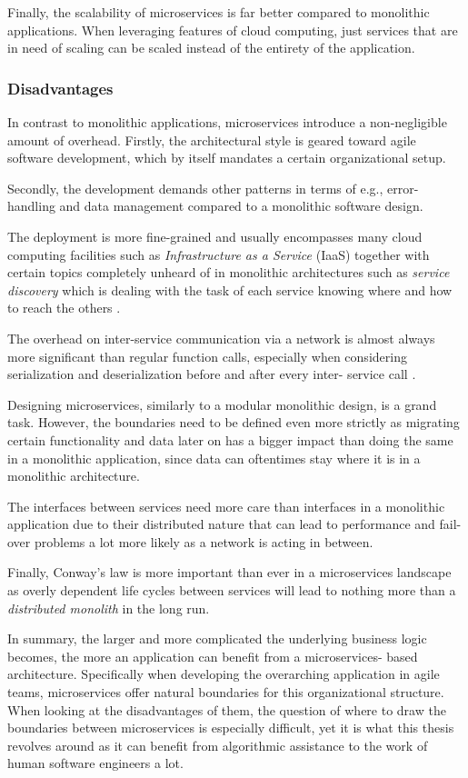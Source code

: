 \documentclass[12pt,a4paper]{report}
\begin{document}
Finally, the scalability of microservices is far better compared to monolithic
applications. When leveraging features of cloud computing, just services that
are in need of scaling can be scaled instead of the entirety of the
application.


\subsubsection{Disadvantages}
In contrast to monolithic applications,
microservices introduce a non\hyp negligible amount of overhead. Firstly, the
architectural style is geared toward agile software development, which by itself
mandates a certain organizational setup.

Secondly, the development demands other patterns in terms of e.g., error\hyp
handling and data management compared to a monolithic software design.

The deployment is more fine-grained and usually encompasses many
cloud computing facilities such as \textit{Infrastructure as a Service} (IaaS)
together with certain topics completely unheard of in monolithic architectures
such as \textit{service discovery} which is dealing with the task of each
service knowing where and how to reach the others \cite{newman2015building}.

The overhead on inter-service communication via a network is almost
always more significant than regular function calls, especially when
considering serialization and deserialization before and after every inter-
service call \cite{knoche2016sustaining, newman2015building}.

Designing microservices, similarly to a modular monolithic
design, is a grand task. However, the boundaries need to be defined even more
strictly as migrating certain functionality and data later on has a bigger
impact than doing the same in a monolithic application, since data can
oftentimes stay where it is in a monolithic architecture.

The interfaces between services need more care than interfaces in a
monolithic application due to their distributed nature that can lead to
performance and fail-over problems a lot more likely as a network is acting in
between.

Finally, Conway's law \cite{conway1968law} is more important than ever in a
microservices landscape as overly dependent life cycles between services will
lead to nothing more than a \textit{distributed monolith} in the long run.

In summary, the larger and more complicated the underlying business
logic becomes, the more an application can benefit from a microservices\hyp
based architecture. Specifically when developing the overarching application in
agile teams, microservices offer natural boundaries for this organizational
structure. When looking at the disadvantages of them, the question
of where to draw the boundaries between microservices is especially difficult,
yet it is what this thesis revolves around as it can benefit from algorithmic
assistance to the work of human software engineers a lot.
\end{document}
